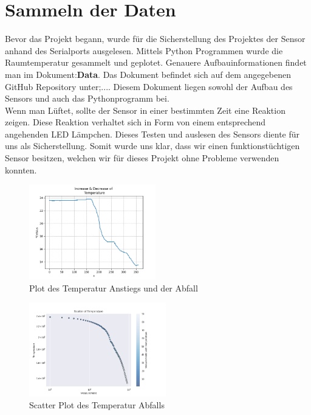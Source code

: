 \documentclass{article}
\begin{document}
\section{Sammeln der Daten}
Bevor das Projekt begann, wurde für die Sicherstellung des Projektes der Sensor anhand des Serialports ausgelesen. Mittels Python Programmen wurde die Raumtemperatur gesammelt und geplotet. Genauere Aufbauinformationen findet man im Dokument:\textbf{Data}. Das Dokument befindet sich auf dem angegebenen GitHub Repository unter;.... Diesem Dokument liegen sowohl der Aufbau des Sensors und auch das Pythonprogramm bei.\\
Wenn man Lüftet, sollte der Sensor in einer bestimmten Zeit eine Reaktion zeigen. Diese Reaktion verhaltet sich in Form von einem entsprechend angehenden LED Lämpchen. Dieses Testen und auslesen des Sensors diente für uns als Sicherstellung. Somit wurde uns klar, dass wir einen funktionstüchtigen Sensor besitzen, welchen wir für dieses Projekt ohne Probleme verwenden konnten.
\begin{figure}[!h]
\begin{center}
\includegraphics[width=0.49\textwidth]{plot.png}
\caption{Plot des Temperatur Anstiegs und der Abfall}
\label{fig:decrease}
\end{center}
\end{figure}
\begin{figure}[!h]
\begin{center}
\includegraphics[width=0.53\textwidth]{scatter.png}
\caption{Scatter Plot des Temperatur Abfalls}
\label{fig:scatter}
\end{center}
\end{figure}
\end{document}
